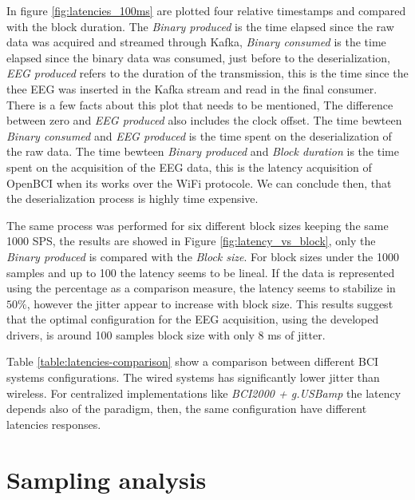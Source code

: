 

In figure \ref{fig:latencies_100ms} are plotted four relative timestamps and compared with the block duration. The \textit{Binary produced} is the time elapsed since the raw data was acquired and streamed through Kafka, \textit{Binary consumed} is the time elapsed since the binary data was consumed, just before to the deserialization, \textit{EEG produced} refers to the duration of the transmission, this is the time since the thee EEG was inserted in the Kafka stream and read in the final consumer.
There is a few facts about this plot that needs to be mentioned, 
The difference between zero and \textit{EEG produced} also includes the clock offset. 
The time bewteen \textit{Binary consumed} and \textit{EEG produced} is the time spent on the deserialization of the raw data.
The time bewteen \textit{Binary produced} and \textit{Block duration} is the time spent on the acquisition of the EEG data, this is the latency acquisition of OpenBCI when its works over the WiFi protocole. 
We can conclude then, that the deserialization process is highly time expensive.



The same process was performed for six different block sizes keeping the same 1000 SPS, the results are showed in Figure \ref{fig:latency_vs_block}, only the \textit{Binary produced} is compared with the \textit{Block size}. For block sizes under the 1000 samples and up to 100 the latency seems to be lineal.
If the data is represented using the percentage as a comparison measure, the latency seems to stabilize in $50 \%$, however the jitter appear to increase with block size. This results suggest that the optimal configuration for the EEG acquisition, using the developed drivers, is around 100 samples block size with only 8 ms of jitter.



Table \ref{table:latencies-comparison} show a comparison between different BCI systems configurations. The wired systems has significantly lower jitter than wireless. For centralized implementations like \textit{BCI2000 + g.USBamp} the latency depends also of the paradigm, then, the same configuration have different latencies responses.






\section{Sampling analysis} 

